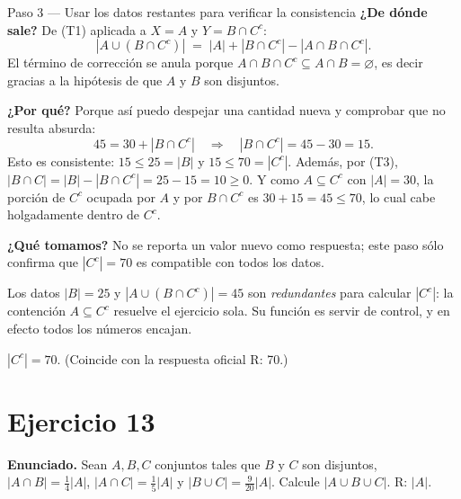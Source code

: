 \documentclass[11pt]{article}
\begin{document}
\begin{sol}
\begin{paso}{Paso 3 --- Usar los datos restantes para verificar la consistencia}
\textbf{¿De dónde sale?} De (T1) aplicada a $X = A$ y $Y = B\cap C^{c}$:
\[
|A\cup (B\cap C^{c})| \;=\; |A| + |B\cap C^{c}| - |A\cap B\cap C^{c}| .
\]
El término de corrección se anula porque $A\cap B\cap C^{c}\subseteq A\cap B = \varnothing$, es decir gracias a la hipótesis de que $A$ y $B$ son disjuntos.

\textbf{¿Por qué?} Porque así puedo despejar una cantidad nueva y comprobar que no resulta absurda:
\[
45 = 30 + |B\cap C^{c}| \quad\Longrightarrow\quad |B\cap C^{c}| = 45 - 30 = 15 .
\]
Esto es consistente: $15 \le 25 = |B|$ y $15 \le 70 = |C^{c}|$. Además, por (T3), $|B\cap C| = |B| - |B\cap C^{c}| = 25 - 15 = 10 \ge 0$. Y como $A\subseteq C^{c}$ con $|A|=30$, la porción de $C^{c}$ ocupada por $A$ y por $B\cap C^{c}$ es $30 + 15 = 45 \le 70$, lo cual cabe holgadamente dentro de $C^{c}$.

\textbf{¿Qué tomamos?} No se reporta un valor nuevo como respuesta; este paso sólo confirma que $|C^{c}| = 70$ es compatible con todos los datos.
\end{paso}

\end{sol}

\begin{nota}
Los datos $|B| = 25$ y $|A\cup(B\cap C^{c})| = 45$ son \emph{redundantes} para calcular $|C^{c}|$: la contención $A\subseteq C^{c}$ resuelve el ejercicio sola. Su función es servir de control, y en efecto todos los números encajan.
\end{nota}

\begin{resp}
$|C^{c}| = 70$. \quad (Coincide con la respuesta oficial R: 70.)
\end{resp}

\section*{Ejercicio 13}

\textbf{Enunciado.} Sean $A, B, C$ conjuntos tales que $B$ y $C$ son disjuntos, $|A\cap B| = \tfrac{1}{4}|A|$, $|A\cap C| = \tfrac{1}{5}|A|$ y $|B\cup C| = \tfrac{9}{20}|A|$. Calcule $|A\cup B\cup C|$. R: $|A|$.
\end{document}
